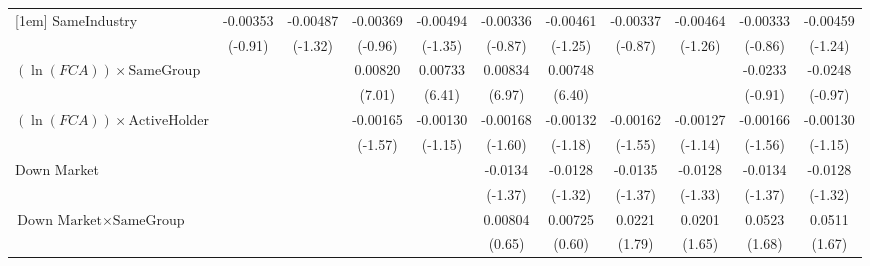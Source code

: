{\begin{tabular}{l*{10}{c}}
[1em]
SameIndustry    & -0.00353         & -0.00487         & -0.00369         & -0.00494         & -0.00336         & -0.00461         & -0.00337         & -0.00464         & -0.00333         & -0.00459         \\
                &  (-0.91)         &  (-1.32)         &  (-0.96)         &  (-1.35)         &  (-0.87)         &  (-1.25)         &  (-0.87)         &  (-1.26)         &  (-0.86)         &  (-1.24)         \\
[1em]
$ (\ln(FCA)) \times {\text{SameGroup} }  $ &                  &                  &  0.00820\sym{***}&  0.00733\sym{***}&  0.00834\sym{***}&  0.00748\sym{***}&                  &                  &  -0.0233         &  -0.0248         \\
                &                  &                  &   (7.01)         &   (6.41)         &   (6.97)         &   (6.40)         &                  &                  &  (-0.91)         &  (-0.97)         \\
[1em]
$ (\ln(FCA)) \times {\text{ActiveHolder} }  $ &                  &                  & -0.00165         & -0.00130         & -0.00168         & -0.00132         & -0.00162         & -0.00127         & -0.00166         & -0.00130         \\
                &                  &                  &  (-1.57)         &  (-1.15)         &  (-1.60)         &  (-1.18)         &  (-1.55)         &  (-1.14)         &  (-1.56)         &  (-1.15)         \\
[1em]
Down Market     &                  &                  &                  &                  &  -0.0134         &  -0.0128         &  -0.0135         &  -0.0128         &  -0.0134         &  -0.0128         \\
                &                  &                  &                  &                  &  (-1.37)         &  (-1.32)         &  (-1.37)         &  (-1.33)         &  (-1.37)         &  (-1.32)         \\
[1em]
$ {\text{Down Market} } \times {\text{SameGroup} }  $ &                  &                  &                  &                  &  0.00804         &  0.00725         &   0.0221         &   0.0201         &   0.0523         &   0.0511         \\
                &                  &                  &                  &                  &   (0.65)         &   (0.60)         &   (1.79)         &   (1.65)         &   (1.68)         &   (1.67)         \\

\end{tabular}}
